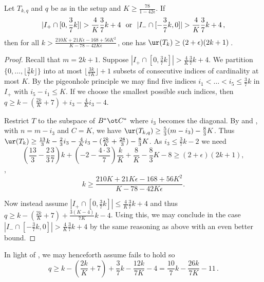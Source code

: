 \documentclass{toc}
\begin{document}
\begin{lemma}\label{claim:no5large} Let $T_{k,q}$ and $q$ be as in the setup and $K \geq \frac{78}{1 - 42 \epsilon}$.
If  
\begin{equation}
    \label{claimhyp}
|I_{+}\cap[0,\frac{3}{7}k]|> \frac{4}{K}\frac{3}{7}k+4\ \ {\rm or}\ \ |I_{-}\cap[-\frac{3}{7}k,0]|> \frac{4}{K}\frac{3}{7}k+4\,,
\end{equation}
then 
for all $k>\frac{210K+21K\epsilon-168+56K^2}{K-78-42K\epsilon}$\,, one has
$\ur(T_k)\geq (2+\epsilon)(2k+1)$\,.
\end{lemma}
\begin{proof} 
Recall that $m=2k+1$. 
Suppose  $|I_{+}\cap[0,\frac{3}{7}k]|> \frac{4}{K}\frac{3}{7}k+4$. We partition $\{0,\dots,\lfloor\frac{3}{7}k\rfloor\}$ into at most $\lfloor\frac{3k}{7K}\rfloor+1$ subsets of consecutive indices of cardinality at most $K$. By the pigeonhole principle
we may find five indices $i_1<\dots<i_5\leq \frac{3}{7}k$ in $I_{+}$ with $i_5-i_1\leq K$. If we choose
the  smallest possible such indices, then $q\geq k-(\frac{2k}{K}+7)+ i_3-\frac 4K i_3-4$.

Restrict $T$ to the subspace of $B^*\ot C^*$ where  $i_3$ becomes the diagonal.
By  and , with $n=m-i_3$ and $C=K$,  
we have $\ur(T_{k,q})\geq \frac 53(m-i_3)-\frac 83K$.
Thus $\ur(T_k)\geq \frac{13}{3}k-\frac{2}{3}i_3-\frac{4}{K}i_3-(\frac{2k}{K}+\frac{28}{3})-\frac 83K$. As $i_3\leq \frac{3}{7}k-2$ we 
need
$$
\left(\frac {13}3-\frac 23\frac 37\right)k+(-2-\frac{4\cdot 3}7)\frac{k}K +\frac{8}K - \frac 83K-8\geq (2+\epsilon)(2k+1),
$$
\ie,
$$
k\geq \frac{210K+21K\epsilon-168+56K^2}{K-78-42K\epsilon}.
$$

Now instead  assume $|I_{+}\cap[0,\frac{3}{7}k]|\leq \frac{4}{K}\frac{3}{7}k+4$ 
and thus  $q\geq k-(\frac{2k}{K}+7)+\frac{3(K-4)}{7K}k-4$. Using this, we may conclude   in the
case $|I_{-}\cap[-\frac{3}{7}k,0]|> \frac{4}{K}\frac{3}{7}k+4$ by the same reasoning as above with an even better bound.  
\end{proof}
In light of  , we may henceforth
assume  %
fails  to hold so 
\begin{equation}\label{qbnd}
q\geq
k-\left(\frac{2k}{K}+7\right)+\frac 37k-\frac{12k}{7K}-4=\frac{10}{7}k-\frac{26k}{7K}-11\,.
\end{equation}
\end{document}

